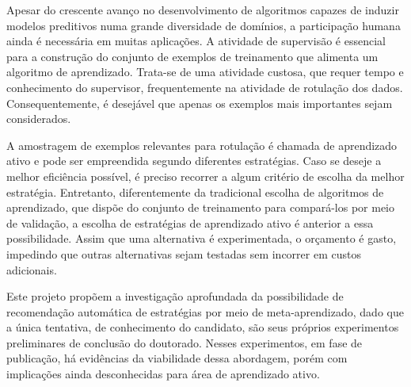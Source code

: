 Apesar do crescente avanço no desenvolvimento de algoritmos capazes de induzir modelos preditivos
numa grande diversidade de domínios, a participação humana ainda é necessária em
muitas aplicações.
A atividade de supervisão é essencial para a construção do conjunto de exemplos
de treinamento que alimenta um algoritmo de aprendizado.
Trata-se de uma atividade custosa, que requer tempo e conhecimento do supervisor,
frequentemente na atividade de rotulação dos dados.
Consequentemente, é desejável que apenas os exemplos mais importantes sejam
considerados.

A amostragem de exemplos relevantes para rotulação é chamada
de aprendizado ativo e pode ser empreendida segundo diferentes estratégias.
Caso se deseje a melhor eficiência possível,
é preciso recorrer a algum critério de escolha da melhor estratégia.
Entretanto, diferentemente da tradicional escolha de algoritmos de aprendizado, que dispõe do conjunto de treinamento para compará-los por meio de validação,
a escolha de estratégias de aprendizado ativo é anterior a essa possibilidade.
Assim que uma alternativa é experimentada, o orçamento é gasto,
impedindo que outras alternativas sejam testadas sem incorrer em custos
adicionais.

Este projeto propõem a investigação aprofundada da possibilidade de recomendação
automática de estratégias por meio de meta-aprendizado,
dado que a única tentativa, de conhecimento do candidato, são seus
próprios experimentos preliminares de conclusão do doutorado.
Nesses experimentos, em fase de publicação,
há evidências da viabilidade dessa abordagem, porém
com implicações ainda desconhecidas para área de aprendizado ativo.